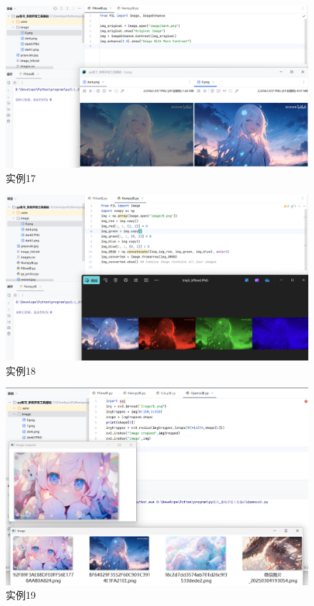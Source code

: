 \documentclass[cn,12pt]{report}
\begin{document}
{      \begin{figure}[htbp]
    \centering
    \includegraphics[width=1\textwidth]{image/16.png}
    \caption{实例17}
  \end{figure}
\FloatBarrier
    \begin{figure}[htbp]
    \centering
    \includegraphics[width=1\textwidth]{image/17.png}
    \caption{实例18}
  \end{figure}
\FloatBarrier

      \begin{figure}[htbp]
    \centering
    \includegraphics[width=1\textwidth]{image/18.png}
    \caption{实例19}
  \end{figure}
\FloatBarrier

}
\end{document}

